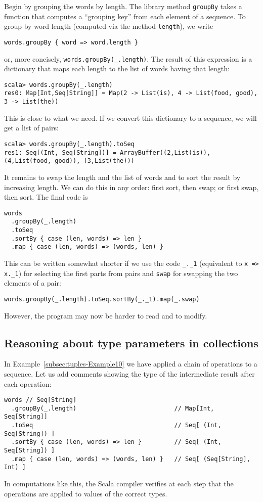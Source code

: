 Begin by grouping the words by length. The library method \lstinline!groupBy!
takes a function that computes a \textsf{``}grouping key\textsf{''} from each element
of a sequence. To group by word length (computed via the method \lstinline!length!),
we write
\begin{lstlisting}
words.groupBy { word => word.length }
\end{lstlisting}
or, more concisely, \lstinline!words.groupBy(_.length)!. The result
of this expression is a dictionary that maps each length to the list
of words having that length:
\begin{lstlisting}
scala> words.groupBy(_.length)
res0: Map[Int,Seq[String]] = Map(2 -> List(is), 4 -> List(food, good), 3 -> List(the))
\end{lstlisting}
This is close to what we need. If we convert this dictionary to a
sequence, we will get a list of pairs:
\begin{lstlisting}
scala> words.groupBy(_.length).toSeq
res1: Seq[(Int, Seq[String])] = ArrayBuffer((2,List(is)), (4,List(food, good)), (3,List(the))) 
\end{lstlisting}
It remains to swap the length and the list of words and to sort the
result by increasing length. We can do this in any order: first sort,
then swap; or first swap, then sort. The final code is
\begin{lstlisting}
words
  .groupBy(_.length)
  .toSeq
  .sortBy { case (len, words) => len }
  .map { case (len, words) => (words, len) }
\end{lstlisting}
This can be written somewhat shorter if we use the code \lstinline!_._1!
(equivalent to \lstinline!x => x._1!) for selecting the first parts
from pairs and \lstinline!swap! for swapping the two elements of
a pair:
\begin{lstlisting}
words.groupBy(_.length).toSeq.sortBy(_._1).map(_.swap)
\end{lstlisting}
However, the program may now be harder to read and to modify.

\subsection{Reasoning about type parameters in collections}

In Example~\ref{subsec:tuples-Example10} we have applied a chain
of operations to a sequence. Let us add comments showing the type
of the intermediate result after each operation:
\begin{lstlisting}
words // Seq[String]
  .groupBy(_.length)                           // Map[Int, Seq[String]]
  .toSeq                                       // Seq[ (Int, Seq[String]) ]
  .sortBy { case (len, words) => len }         // Seq[ (Int, Seq[String]) ]
  .map { case (len, words) => (words, len) }   // Seq[ (Seq[String], Int) ]
\end{lstlisting}
In computations like this, the Scala compiler verifies at each step
that the operations are applied to values of the correct types.

